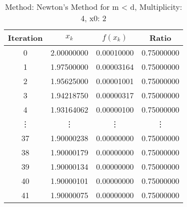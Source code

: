 \begin{table}
\centering
\caption{Method: Newton's Method for m < d, Multiplicity: 4, x0: 2}
\label{tab:table_Newton's_Method_for_m_<_d_4_2}
\begin{tabular}{c c c c}
\toprule
Iteration &      $x_k$ &   $f(x_k)$ &      Ratio \\
\midrule
        0 & 2.00000000 & 0.00010000 & 0.75000000 \\
        1 & 1.97500000 & 0.00003164 & 0.75000000 \\
        2 & 1.95625000 & 0.00001001 & 0.75000000 \\
        3 & 1.94218750 & 0.00000317 & 0.75000000 \\
        4 & 1.93164062 & 0.00000100 & 0.75000000 \\
   \vdots &     \vdots &     \vdots &     \vdots \\
       37 & 1.90000238 & 0.00000000 & 0.75000000 \\
       38 & 1.90000179 & 0.00000000 & 0.75000000 \\
       39 & 1.90000134 & 0.00000000 & 0.75000000 \\
       40 & 1.90000101 & 0.00000000 & 0.75000000 \\
       41 & 1.90000075 & 0.00000000 & 0.75000000 \\
\bottomrule
\end{tabular}
\end{table}
